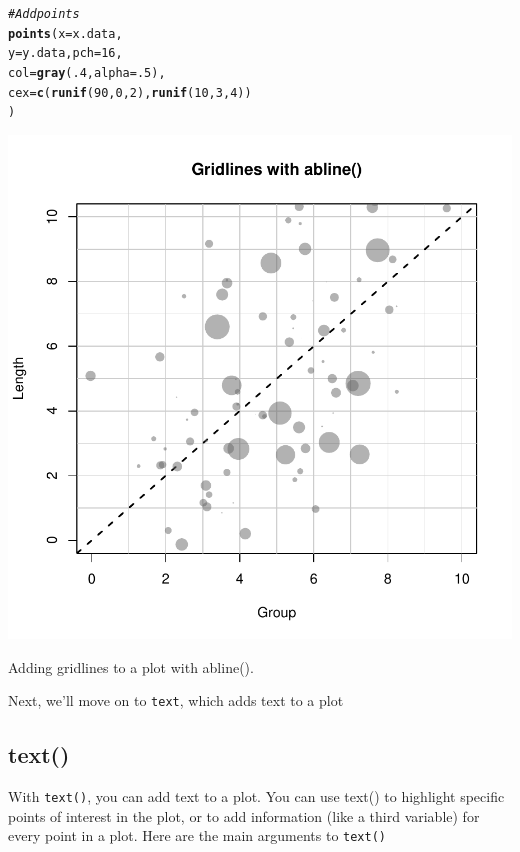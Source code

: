 \documentclass{tufte-book}\usepackage[]{graphicx}\usepackage[]{color}
\makeatletter
\def\maxwidth{ %
  \ifdim\Gin@nat@width>\linewidth
    \linewidth
  \else
    \Gin@nat@width
  \fi
}
\newcommand{\hlnum}[1]{\textcolor[rgb]{0.686,0.059,0.569}{#1}}%
\newcommand{\hlcom}[1]{\textcolor[rgb]{0.678,0.584,0.686}{\textit{#1}}}%
\newcommand{\hlstd}[1]{\textcolor[rgb]{0.345,0.345,0.345}{#1}}%
\newcommand{\hlkwc}[1]{\textcolor[rgb]{0.333,0.667,0.333}{#1}}%
\newcommand{\hlkwd}[1]{\textcolor[rgb]{0.737,0.353,0.396}{\textbf{#1}}}%
\newenvironment{kframe}{%
 \def\at@end@of@kframe{}%
 \ifinner\ifhmode%
  \def\at@end@of@kframe{\end{minipage}}%
  \begin{minipage}{\columnwidth}%
 \fi\fi%
 \def\FrameCommand##1{\hskip\@totalleftmargin \hskip-\fboxsep
 \colorbox{shadecolor}{##1}\hskip-\fboxsep
     \hskip-\linewidth \hskip-\@totalleftmargin \hskip\columnwidth}%
 \MakeFramed {\advance\hsize-\width
   \@totalleftmargin\z@ \linewidth\hsize
   \@setminipage}}%
 {\par\unskip\endMakeFramed%
 \at@end@of@kframe}
\newenvironment{knitrout}{}{} %
\makeatother
\begin{document}
\begin{footnotesize}
\begin{marginfigure}
\begin{tiny}
\begin{knitrout}
\begin{kframe}
\begin{alltt}
\hlcom{# Add points}
\hlkwd{points}\hlstd{(}\hlkwc{x} \hlstd{= x.data,}
       \hlkwc{y} \hlstd{= y.data,} \hlkwc{pch} \hlstd{=} \hlnum{16}\hlstd{,}
       \hlkwc{col} \hlstd{=} \hlkwd{gray}\hlstd{(}\hlnum{.4}\hlstd{,} \hlkwc{alpha} \hlstd{=} \hlnum{.5}\hlstd{),}
       \hlkwc{cex} \hlstd{=} \hlkwd{c}\hlstd{(}\hlkwd{runif}\hlstd{(}\hlnum{90}\hlstd{,} \hlnum{0}\hlstd{,} \hlnum{2}\hlstd{),} \hlkwd{runif}\hlstd{(}\hlnum{10}\hlstd{,} \hlnum{3}\hlstd{,} \hlnum{4}\hlstd{))}
       \hlstd{)}
\end{alltt}
\end{kframe}
\includegraphics[width=\maxwidth]{figure/unnamed-chunk-152-1} 

\end{knitrout}
\caption{Adding gridlines to a plot with abline().}
\label{fig:gridlinesexample}
\end{tiny}
\end{marginfigure}

Next, we'll move on to \texttt{text}, which adds text to a plot

\subsection{text()}

With \texttt{text()}, you can add text to a plot. You can use text() to highlight specific points of interest in the plot, or to add information (like a third variable) for every point in a plot. Here are the main arguments to \texttt{text()}





\end{footnotesize}
\end{document}
